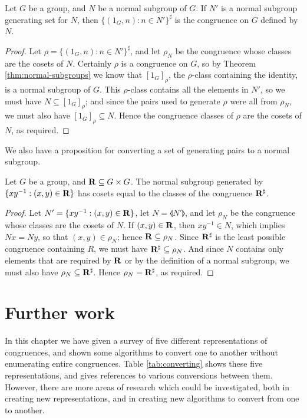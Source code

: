 \begin{proposition}
  \label{prop:normal-subgroup-to-genpairs}
  Let $G$ be a group, and $N$ be a normal subgroup of $G$.  If $N'$ is a
  normal subgroup generating set for $N$, then $\{(1_G, n) : n \in N'\}^\sharp$
  is the congruence on $G$ defined by $N$.
  \begin{proof}
    Let $\rho = \{(1_G, n) : n \in N'\}^\sharp$, and let $\rho_N$ be the
    congruence whose classes are the cosets of $N$.  Certainly $\rho$ is a
    congruence on $G$, so by Theorem \ref{thm:normal-subgroups} we know that
    $[1_G]_\rho$, the $\rho$-class containing the identity, is a normal subgroup
    of $G$.  This $\rho$-class contains all the elements in $N'$, so we must
    have $N \subseteq [1_G]_\rho$; and since the pairs used to generate $\rho$
    were all from $\rho_N$, we must also have $[1_G]_\rho \subseteq N$.  Hence
    the congruence classes of $\rho$ are the cosets of $N$, as required.
  \end{proof}
\end{proposition}

We also have a proposition for converting a set of generating pairs to a normal
subgroup.

\begin{proposition}
  \label{prop:genpairs-to-normal-subgroup}
  Let $G$ be a group, and $\mathbf{R} \subseteq G \times G$.  The normal subgroup
  generated by $\{xy^{-1} : (x,y) \in \mathbf{R}\}$ has cosets equal to the classes of
  the congruence $\mathbf{R}^\sharp$.
  \begin{proof}
    Let $N' = \{xy^{-1} : (x,y) \in \mathbf{R}\}$, let $N = \llangle N' \rrangle$, and
    let $\rho_N$ be the congruence whose classes are the cosets of $N$.  If
    $(x,y) \in \mathbf{R}$, then $xy^{-1} \in N$, which implies $Nx=Ny$, so that
    $(x,y) \in \rho_N$; hence $\mathbf{R} \subseteq \rho_N$.  Since $\mathbf{R}^\sharp$ is the least
    possible congruence containing $R$, we must have $\mathbf{R}^\sharp \subseteq \rho_N$.
    And since $N$ contains only elements that are required by $\mathbf{R}$ or by the
    definition of a normal subgroup, we must also have $\rho_N \subseteq \mathbf{R}^\sharp$.
    Hence $\rho_N = \mathbf{R}^\sharp$, as required.
  \end{proof}
\end{proposition}

\section{Further work}
\label{sec:converting-further-work}

In this chapter we have given a survey of five different representations of
congruences, and shown some algorithms to convert one to another without
enumerating entire congruences.  Table \ref{tab:converting} shows these five
representations, and gives references to various conversions between them.
However, there are more areas of research which could be investigated, both in
creating new representations, and in creating new algorithms to convert from one
to another.

